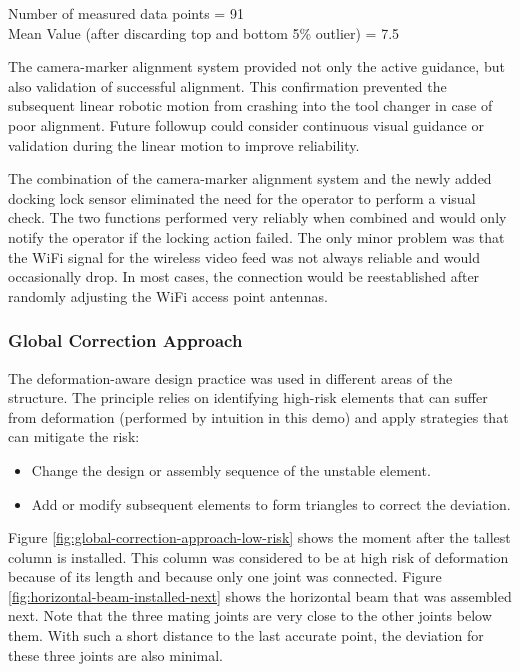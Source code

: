 Number of measured data points = 91\\
Mean Value (after discarding top and bottom 5\% outlier) = 7.5

The camera-marker alignment system provided not only the active guidance, but also validation of successful alignment. This confirmation prevented the subsequent linear robotic motion from crashing into the tool changer in case of poor alignment. Future followup could consider continuous visual guidance or validation during the linear motion to improve reliability.

The combination of the camera-marker alignment system and the newly added docking lock sensor eliminated the need for the operator to perform a visual check. The two functions performed very reliably when combined and would only notify the operator if the locking action failed. The only minor problem was that the WiFi signal for the wireless video feed was not always reliable and would occasionally drop. In most cases, the connection would be reestablished after randomly adjusting the WiFi access point antennas. 

\subsubsection{Global Correction Approach}
\label{subsubsection:exploration-4-global-correction-approach}

The deformation-aware design practice was used in different areas of the structure. The principle relies on identifying high-risk elements that can suffer from deformation (performed by intuition in this demo) and apply strategies that can mitigate the risk:
\begin{itemize}
    \item Change the design or assembly sequence of the unstable element.
    \item Add or modify subsequent elements to form triangles to correct the deviation.
\end{itemize}

Figure \ref{fig:global-correction-approach-low-risk} shows the moment after the tallest column is installed. This column was considered to be at high risk of deformation because of its length and because only one joint was connected. Figure \ref{fig:horizontal-beam-installed-next} shows the horizontal beam that was assembled next. Note that the three mating joints are very close to the other joints below them. With such a short distance to the last accurate point, the deviation for these three joints are also minimal. 

